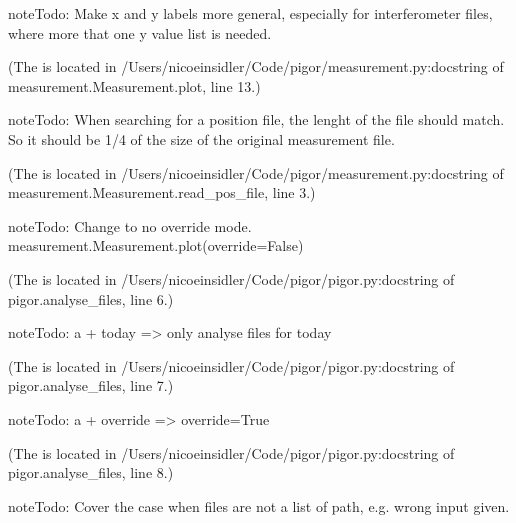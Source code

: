 \documentclass[letterpaper,10pt,english]{sphinxmanual}
\begin{document}
\begin{sphinxadmonition}{note}{Todo:}
Make x and y labels more general, especially for interferometer files, where more that one y value list is needed.
\end{sphinxadmonition}

(The {\hyperref[\detokenize{measurement:index-5}]{}} is located in /Users/nicoeinsidler/Code/pigor/measurement.py:docstring of measurement.Measurement.plot, line 13.)

\begin{sphinxadmonition}{note}{Todo:}
When searching for a position file, the lenght of the file should match. So it should be 1/4 of the size of the original measurement file.
\end{sphinxadmonition}

(The {\hyperref[\detokenize{measurement:index-6}]{}} is located in /Users/nicoeinsidler/Code/pigor/measurement.py:docstring of measurement.Measurement.read\_pos\_file, line 3.)

\begin{sphinxadmonition}{note}{Todo:}
Change to no override mode. measurement.Measurement.plot(override=False)
\end{sphinxadmonition}

(The {\hyperref[\detokenize{pigor:index-0}]{}} is located in /Users/nicoeinsidler/Code/pigor/pigor.py:docstring of pigor.analyse\_files, line 6.)

\begin{sphinxadmonition}{note}{Todo:}
a + today =\textgreater{} only analyse files for today
\end{sphinxadmonition}

(The {\hyperref[\detokenize{pigor:index-1}]{}} is located in /Users/nicoeinsidler/Code/pigor/pigor.py:docstring of pigor.analyse\_files, line 7.)

\begin{sphinxadmonition}{note}{Todo:}
a + override =\textgreater{} override=True
\end{sphinxadmonition}

(The {\hyperref[\detokenize{pigor:index-2}]{}} is located in /Users/nicoeinsidler/Code/pigor/pigor.py:docstring of pigor.analyse\_files, line 8.)

\begin{sphinxadmonition}{note}{Todo:}
Cover the case when files are not a list of path, e.g. wrong input given.
\end{sphinxadmonition}
\end{document}
